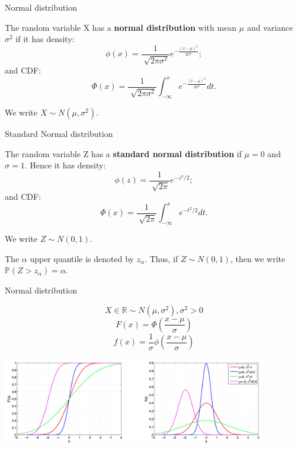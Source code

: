 \documentclass{beamer}
\begin{document}
\begin{frame}
{\centerline{Normal distribution}}

The random variable X has a \textbf{normal distribution} with mean $\mu$ and variance $\sigma^2$ if it has density:
$$\phi(x) = \frac{1}{\sqrt[]{2\pi\sigma^2}} e^{-\frac{(x-\mu)^2}{2\sigma^2}}; $$
and CDF: 
$$\Phi(x) = \frac{1}{\sqrt[]{2\pi\sigma^2}} \int_{-\infty}^{x} e^{-\frac{(t-\mu)^2}{2\sigma^2}} dt.$$

We write $X \sim N(\mu,\sigma^2).$
\end{frame}


\begin{frame}
{\centerline{Standard Normal distribution}}

The random variable Z has a \textbf{standard normal distribution} if $\mu=0$ and $\sigma=1$. Hence it has density:
$$\phi(z) = \frac{1}{\sqrt[]{2\pi}} e^{-z^2/2}; $$
and CDF: 
$$\Phi(x) = \frac{1}{\sqrt[]{2\pi}} \int_{-\infty}^{x} e^{-t^2/2} dt.$$

We write $Z \sim N(0,1).$ 

The $\alpha$ upper quantile is denoted by $z_\alpha$. Thus, if $Z \sim N(0,1)$, then we write $\mathbb{P}(Z>z_\alpha) = \alpha.$

\end{frame}




\begin{frame}
{\centerline{Normal distribution}}
$$X \in \mathbb{R} \sim N(\mu,\sigma^2), \sigma^2 > 0$$
$$F(x) = \Phi(\frac{x-\mu}{\sigma})$$
$$f(x) = \frac{1}{\sigma}\phi(\frac{x-\mu}{\sigma})$$


\begin{center}
\includegraphics[width=11.5cm]{A2022.FondamentiStatistica/norm-distr.jpg}
\end{center} 
\end{frame}
\end{document}
